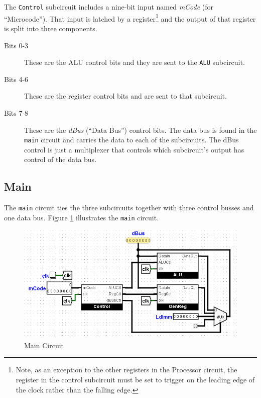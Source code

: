 The \lstinline[columns=fixed]|Control| subcircuit includes a nine-bit input named \textit{mCode} (for ``Microcode''). That input is latched by a register\footnote{Note, as an exception to the other registers in the Processor circuit, the register in the control subcircuit must be set to trigger on the leading edge of the clock rather than the falling edge.} and the output of that register is split into three components.

\begin{description}
	\item[Bits 0-3] These are the \ac{ALU} control bits and they are sent to the \lstinline[columns=fixed]|ALU| subcircuit.
	\item[Bits 4-6] These are the register control bits and are sent to that subcircuit.
	\item[Bits 7-8] These are the \textit{dBus} (``Data Bus'') control bits. The data bus is found in the \lstinline[columns=fixed]|main| circuit and carries the data to each of the subcircuits. The dBus control is just a multiplexer that controls which subcircuit's output has control of the data bus.
\end{description}

\subsection{Main}

The \lstinline[columns=fixed]|main| circuit ties the three subcircuits together with three control busses and one data bus. Figure \ref{fig:11-05} illustrates the \lstinline[columns=fixed]|main| circuit.

\begin{figure}[H]
	\centering
	\includegraphics[width=\maxwidth{.95\linewidth}]{gfx/11-05}
	\caption{Main Circuit}
	\label{fig:11-05}
\end{figure}

